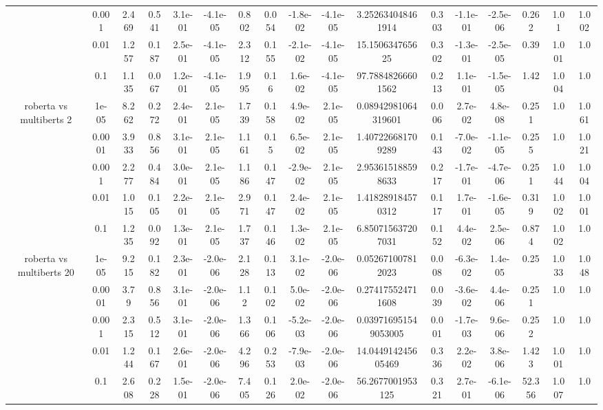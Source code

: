 \begin{tabular}{|c|c|c|c|c|c|c|c|c|c|c|c|c|c|c|c|c|}
 & 0.001 & 2.469 & 0.541 & 3.1e-01 & -4.1e-05 & 0.802 & 0.054 & -1.8e-02 & -4.1e-05 & 3.252634048461914 & 0.303 & -1.1e-01 & -2.5e-06 & 0.262 & 1.01 & 1.002 \\
 & 0.01 & 1.257 & 0.187 & 2.5e-01 & -4.1e-05 & 2.312 & 0.155 & -2.1e-02 & -4.1e-05 & 15.150634765625 & 0.302 & -1.3e-01 & -2.5e-05 & 0.39 & 1.001 & 1.0 \\
 & 0.1 & 1.135 & 0.067 & 1.2e-01 & -4.1e-05 & 1.995 & 0.16 & 1.6e-02 & -4.1e-05 & 97.78848266601562 & 0.213 & 1.1e-01 & -1.5e-05 & 1.42 & 1.004 & 1.0 \\
\hline
\multirow{5}{*}{roberta  vs multiberts 2} & 1e-05 & 8.262 & 0.272 & 2.4e-01 & 2.1e-05 & 1.739 & 0.158 & 4.9e-02 & 2.1e-05 & 0.08942981064319601 & 0.006 & 2.7e-02 & 4.8e-08 & 0.251 & 1.0 & 1.061 \\
 & 0.0001 & 3.933 & 0.856 & 3.1e-01 & 2.1e-05 & 1.161 & 0.15 & 6.5e-02 & 2.1e-05 & 1.407226681709289 & 0.143 & -7.0e-02 & -1.1e-05 & 0.255 & 1.0 & 1.021 \\
 & 0.001 & 2.277 & 0.484 & 3.0e-01 & 2.1e-05 & 1.186 & 0.147 & -2.9e-02 & 2.1e-05 & 2.953615188598633 & 0.217 & -1.7e-01 & -4.7e-06 & 0.251 & 1.044 & 1.004 \\
 & 0.01 & 1.015 & 0.105 & 2.2e-01 & 2.1e-05 & 2.971 & 0.147 & 2.4e-02 & 2.1e-05 & 1.418289184570312 & 0.117 & 1.7e-01 & -1.6e-05 & 0.319 & 1.002 & 1.001 \\
 & 0.1 & 1.235 & 0.092 & 1.3e-01 & 2.1e-05 & 1.737 & 0.146 & 1.3e-02 & 2.1e-05 & 6.850715637207031 & 0.152 & 4.4e-02 & 2.5e-06 & 0.874 & 1.002 & 1.0 \\
\hline
\multirow{5}{*}{roberta  vs multiberts 20} & 1e-05 & 9.215 & 0.182 & 2.3e-01 & -2.0e-06 & 2.128 & 0.113 & 3.1e-02 & -2.0e-06 & 0.052671007812023 & 0.008 & -6.3e-02 & 1.4e-05 & 0.25 & 1.033 & 1.048 \\
 & 0.0001 & 3.79 & 0.856 & 3.1e-01 & -2.0e-06 & 1.12 & 0.102 & 5.0e-02 & -2.0e-06 & 0.274175524711608 & 0.039 & -3.6e-02 & 4.4e-06 & 0.251 & 1.0 & 1.0 \\
 & 0.001 & 2.315 & 0.512 & 3.1e-01 & -2.0e-06 & 1.366 & 0.106 & -5.2e-03 & -2.0e-06 & 0.039716951549053005 & 0.001 & -1.7e-03 & 9.6e-06 & 0.252 & 1.0 & 1.0 \\
 & 0.01 & 1.244 & 0.167 & 2.6e-01 & -2.0e-06 & 4.296 & 0.253 & -7.9e-03 & -2.0e-06 & 14.044914245605469 & 0.336 & 2.2e-02 & 3.8e-06 & 1.423 & 1.001 & 1.0 \\
 & 0.1 & 2.608 & 0.228 & 1.5e-01 & -2.0e-06 & 7.405 & 0.126 & 2.0e-02 & -2.0e-06 & 56.2677001953125 & 0.321 & 2.7e-01 & -6.1e-06 & 52.356 & 1.007 & 1.0 \\

\end{tabular}
